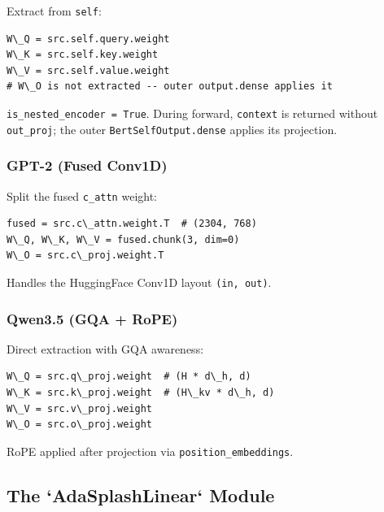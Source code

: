 Extract from \texttt{self}:

\begin{lstlisting}
W\_Q = src.self.query.weight
W\_K = src.self.key.weight
W\_V = src.self.value.weight
# W\_O is not extracted -- outer output.dense applies it
\end{lstlisting}

\texttt{is\_nested\_encoder = True}. During forward, \texttt{context} is returned without 
\texttt{out\_proj}; the outer \texttt{BertSelfOutput.dense} applies its projection.

\subsubsection{GPT-2 (Fused Conv1D)}

Split the fused \texttt{c\_attn} weight:

\begin{lstlisting}
fused = src.c\_attn.weight.T  # (2304, 768)
W\_Q, W\_K, W\_V = fused.chunk(3, dim=0)
W\_O = src.c\_proj.weight.T
\end{lstlisting}

Handles the HuggingFace Conv1D layout \texttt{(in, out)}.

\subsubsection{Qwen3.5 (GQA + RoPE)}

Direct extraction with GQA awareness:

\begin{lstlisting}
W\_Q = src.q\_proj.weight  # (H * d\_h, d)
W\_K = src.k\_proj.weight  # (H\_kv * d\_h, d)
W\_V = src.v\_proj.weight
W\_O = src.o\_proj.weight
\end{lstlisting}

RoPE applied after projection via \texttt{position\_embeddings}.

\subsection{The `AdaSplashLinear` Module}

